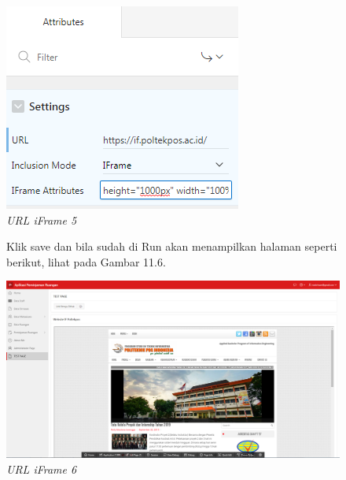 \begin{enumerate}
\begin{figure}
        \centering
        \includegraphics[scale=0.5]{figures/bab12/5.png}
        \caption{\textit{URL iFrame 5}}
        \label{URL iFrame 5}
    \end{figure}
    
    \begin{figure}
    \item Klik save dan bila sudah di Run akan menampilkan halaman seperti berikut, lihat pada Gambar 11.6.
        
        \centering
        \includegraphics[scale=0.22]{figures/bab12/6.png}
        \caption{\textit{URL iFrame 6}}
        \label{URL iFrame 6}
    \end{figure}
    
    
\end{enumerate}
 